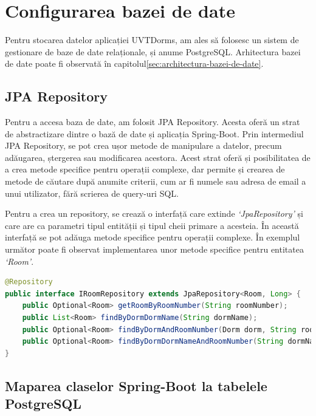 \documentclass[12pt,a4paper]{report}
\theoremstyle{definition}
\theoremstyle{remark}
\begin{document}
\section{Configurarea bazei de date}

\par Pentru stocarea datelor aplicației UVTDorms, am ales să folosesc un sistem de gestionare de baze de date relaționale, și anume PostgreSQL\cite{drake2002practical}. Arhitectura bazei de date poate fi observată în capitolul\ref{sec:architectura-bazei-de-date}.

\subsection{JPA Repository}

\par Pentru a accesa baza de date, am folosit JPA Repository\cite{gierke2012spring}. Acesta oferă un strat de abstractizare dintre o bază de date și aplicația Spring-Boot. Prin intermediul JPA Repository, se pot crea ușor metode de manipulare a datelor, precum adăugarea, ștergerea sau modificarea acestora. Acest strat oferă și posibilitatea de a crea metode specifice pentru operații complexe, dar permite și crearea de metode de căutare după anumite criterii, cum ar fi numele sau adresa de email a unui utilizator, fără scrierea de query-uri SQL\@.

\par Pentru a crea un repository, se crează o interfață care extinde \textit{`JpaRepository'} și care are ca parametri tipul entității și tipul cheii primare a acesteia. În această interfață se pot adăuga metode specifice pentru operații complexe. În exemplul următor poate fi observat implementarea unor metode specifice pentru entitatea \textit{`Room'}.

\begin{lstlisting}[language=Java, caption={Interfața JPA Repository pentru entitatea Room}]
@Repository
public interface IRoomRepository extends JpaRepository<Room, Long> {
    public Optional<Room> getRoomByRoomNumber(String roomNumber);
    public List<Room> findByDormDormName(String dormName);
    public Optional<Room> findByDormAndRoomNumber(Dorm dorm, String roomNumber);
    public Optional<Room> findByDormDormNameAndRoomNumber(String dormName, String roomNumber);
}
\end{lstlisting}

\subsection{Maparea claselor Spring-Boot la tabelele PostgreSQL}
\end{document}
